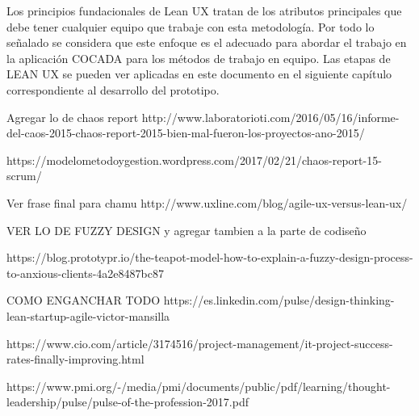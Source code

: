


Los principios fundacionales de Lean UX tratan de los atributos principales que debe tener cualquier equipo que trabaje con esta metodología.
Por todo lo señalado se considera que este enfoque es el adecuado para abordar el trabajo en la aplicación COCADA para los métodos de trabajo en equipo.
Las etapas de LEAN UX se pueden ver aplicadas en este documento en el siguiente capítulo correspondiente al desarrollo del prototipo.



Agregar lo de chaos report http://www.laboratorioti.com/2016/05/16/informe-del-caos-2015-chaos-report-2015-bien-mal-fueron-los-proyectos-ano-2015/

https://modelometodoygestion.wordpress.com/2017/02/21/chaos-report-15-scrum/

Ver frase final para chamu
http://www.uxline.com/blog/agile-ux-versus-lean-ux/



VER LO DE FUZZY DESIGN y agregar tambien a la parte de codiseño

https://blog.prototypr.io/the-teapot-model-how-to-explain-a-fuzzy-design-process-to-anxious-clients-4a2e8487bc87


COMO ENGANCHAR TODO
https://es.linkedin.com/pulse/design-thinking-lean-startup-agile-victor-mansilla


https://www.cio.com/article/3174516/project-management/it-project-success-rates-finally-improving.html



https://www.pmi.org/-/media/pmi/documents/public/pdf/learning/thought-leadership/pulse/pulse-of-the-profession-2017.pdf